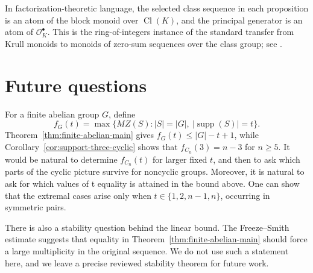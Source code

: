 \documentclass[12pt,reqno]{amsart}
\theoremstyle{definition}
\theoremstyle{remark}
\DeclareMathOperator{\supp}{supp}
\newcommand{\Cl}{\operatorname{Cl}}
\newcommand{\cO}{\mathcal O}
\begin{document}
In factorization-theoretic language, the selected class sequence in each proposition is an atom of the block monoid over $\Cl(K)$, and the principal generator is an atom of $\cO_K^\bullet$.  This is the ring-of-integers instance of the standard transfer from Krull monoids to monoids of zero-sum sequences over the class group; see \cite{GeroldingerHalterKoch2006,GeroldingerKainrath2021,Schmid2004BlockMonoids}.

\section{Future questions}

For a finite abelian group $G$, define
\[
 f_G(t)=\max\{MZ(S): |S|=|G|,\ |\supp(S)|=t\}.
\]
Theorem~\ref{thm:finite-abelian-main} gives $f_G(t)\le |G|-t+1$, while Corollary~\ref{cor:support-three-cyclic} shows that $f_{C_n}(3)=n-3$ for $n\ge 5$.  It would be natural to determine $f_{C_n}(t)$ for larger fixed $t$, and then to ask which parts of the cyclic picture survive for noncyclic groups. Moreover, it is natural to ask for which values of t equality is attained in the bound above. One can show that the extremal cases arise only when $t\in \{1,2,n-1,n\}$, occurring in symmetric pairs.

There is also a stability question behind the linear bound.  The Freeze--Smith estimate suggests that equality in Theorem~\ref{thm:finite-abelian-main} should force a large multiplicity in the original sequence.  We do not use such a statement here, and we leave a precise reviewed stability theorem for future work.



\end{document}
